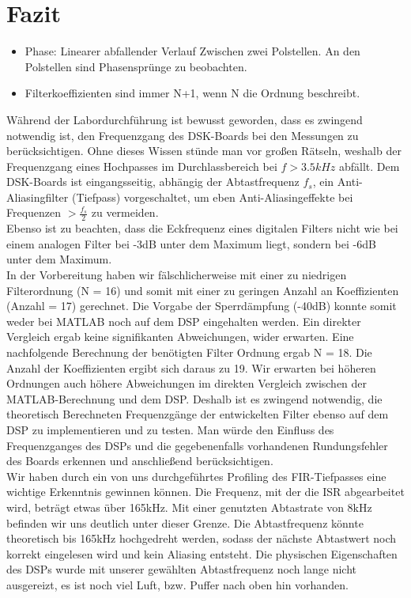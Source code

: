 \section{Fazit}
\begin{itemize}
	\item Phase: Linearer abfallender Verlauf Zwischen zwei Polstellen. An den Polstellen sind Phasensprünge zu beobachten.
	\item Filterkoeffizienten sind immer N+1, wenn N die Ordnung beschreibt.
\end{itemize}
\noindent Während der Labordurchführung ist bewusst geworden, dass es zwingend notwendig ist, den Frequenzgang des DSK-Boards bei den Messungen zu berücksichtigen. Ohne dieses Wissen stünde man vor großen Rätseln, weshalb der Frequenzgang eines Hochpasses im Durchlassbereich bei $f>3.5kHz$ abfällt. Dem DSK-Boards ist eingangsseitig, abhängig der Abtastfrequenz $f_s$, ein Anti-Aliasingfilter (Tiefpass) vorgeschaltet, um eben Anti-Aliasingeffekte bei Frequenzen $>\frac{f_s}{2}$ zu vermeiden.\\
\noindent Ebenso ist zu beachten, dass die Eckfrequenz eines digitalen Filters nicht wie bei einem analogen Filter bei -3dB unter dem Maximum liegt, sondern bei -6dB unter dem Maximum.\\
\noindent In der Vorbereitung haben wir fälschlicherweise mit einer zu niedrigen Filterordnung (N = 16) und somit mit einer zu geringen Anzahl an Koeffizienten (Anzahl = 17) gerechnet. Die Vorgabe der Sperrdämpfung (-40dB) konnte somit weder bei MATLAB noch auf dem DSP eingehalten werden. Ein direkter Vergleich ergab keine signifikanten Abweichungen, wider erwarten. Eine nachfolgende Berechnung der benötigten Filter Ordnung ergab N = 18. Die Anzahl der Koeffizienten ergibt sich daraus zu 19. Wir erwarten bei höheren Ordnungen auch höhere Abweichungen im direkten Vergleich zwischen der MATLAB-Berechnung und dem DSP. Deshalb ist es zwingend notwendig, die theoretisch Berechneten Frequenzgänge der entwickelten Filter ebenso auf dem DSP zu implementieren und zu testen. Man würde den Einfluss des Frequenzganges des DSPs und die gegebenenfalls vorhandenen Rundungsfehler des Boards erkennen und anschließend berücksichtigen.\\
\noindent Wir haben durch ein von uns durchgeführtes Profiling des FIR-Tiefpasses eine wichtige Erkenntnis gewinnen können. Die Frequenz, mit der die ISR abgearbeitet wird, beträgt etwas über 165kHz. Mit einer genutzten Abtastrate von 8kHz befinden wir uns deutlich unter dieser Grenze. Die Abtastfrequenz könnte theoretisch bis 165kHz hochgedreht werden, sodass der nächste Abtastwert noch korrekt eingelesen wird und kein Aliasing entsteht. Die physischen Eigenschaften des DSPs wurde mit unserer gewählten Abtastfrequenz noch lange nicht ausgereizt, es ist noch viel Luft, bzw. Puffer nach oben hin vorhanden. 
